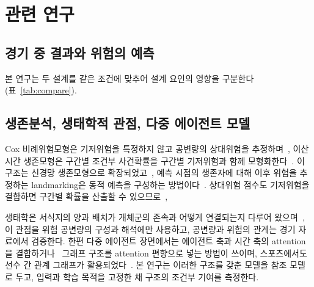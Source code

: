 \section{관련 연구}
\label{sec:related}

\subsection{경기 중 결과와 위험의 예측}
\label{sec:related:esports}

본 연구는 두 설계를 같은 조건에 맞추어 설계 요인의 영향을 구분한다(표~\ref{tab:compare}).

\subsection{생존분석, 생태학적 관점, 다중 에이전트 모델}
\label{sec:related:survival}

Cox 비례위험모형은 기저위험을 특정하지 않고 공변량의 상대위험을 추정하며~\cite{Cox72}, 이산시간 생존모형은 구간별 조건부 사건확률을 구간별 기저위험과 함께 모형화한다~\cite{SingerWillett93}.
이 구조는 신경망 생존모형으로 확장되었고~\cite{Gensheimer19}, 예측 시점의 생존자에 대해 이후 위험을 추정하는 landmarking은 동적 예측을 구성하는 방법이다~\cite{vanHouwelingen07}.
상대위험 점수도 기저위험을 결합하면 구간별 확률을 산출할 수 있으므로~\cite{PrenticeGloeckler78}, 

생태학은 서식지의 양과 배치가 개체군의 존속과 어떻게 연결되는지 다루어 왔으며~\cite{Fahrig03},  이 관점을 위험 공변량의 구성과 해석에만 사용하고, 공변량과 위험의 관계는 경기 자료에서 검증한다.
한편 다중 에이전트 장면에서는 에이전트 축과 시간 축의 attention을 결합하거나~\cite{Ngiam22} 그래프 구조를 attention 편향으로 넣는 방법이 쓰이며, 스포츠에서도 선수 간 관계 그래프가 활용되었다~\cite{Xenopoulos21}.
본 연구는 이러한 구조를 갖춘 모델을 참조 모델로 두고, 입력과 학습 목적을 고정한 채 구조의 조건부 기여를 측정한다.
